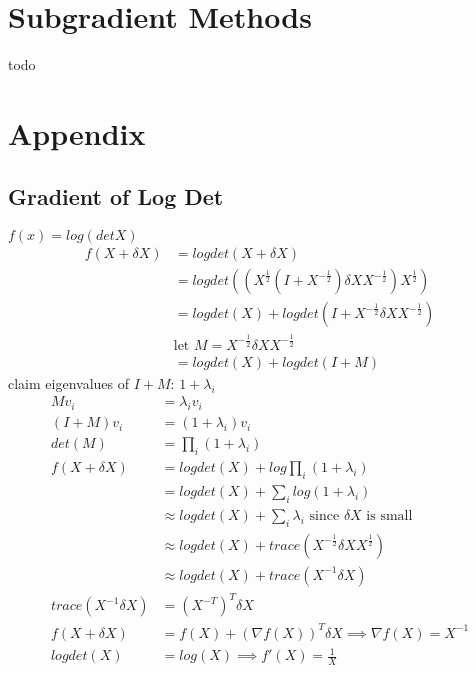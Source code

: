 \documentclass[8pt]{report}
\begin{document}
\begin{multicols*}{2}
  \pagebreak

  \section{Subgradient Methods}

  todo

  \pagebreak
  
  \section{Appendix}

  \subsection{Gradient of Log Det}
  $f(x)=log(det X)$\\
  \begin{align*}
    f(X+\delta X) &= logdet(X+\delta X)\\
                  &= logdet((X^{\frac{1}{2}}(I+X^{-\frac{1}{2}}) \delta X X^{-\frac{1}{2}})X^{\frac{1}{2}})\\
                  &= logdet(X)+logdet(I+X^{-\frac{1}{2}} \delta X X^{-\frac{1}{2}})\\
                  & \text{let } M = X^{-\frac{1}{2}} \delta X X^{-\frac{1}{2}}\\
                  &= logdet(X)+logdet(I+M)
  \end{align*}
  claim eigenvalues of $I+M$: $1+\lambda_i$
  \begin{align*}
    Mv_i &= \lambda_i v_i\\
    (I+M)v_i &= (1+\lambda_i)v_i\\
    det(M)&=\prod_i(1+\lambda_i)\\
    f(X+\delta X) &= logdet(X) + log \prod_i(1+\lambda_i)\\
         &= logdet(X) + \sum_i log(1+\lambda_i)\\
         &\approx logdet(X) + \sum_i \lambda_i \text{ since } \delta X \text{ is small}\\
         &\approx logdet(X) + trace(X^{-\frac{1}{2}} \delta X X^{\frac{1}{2}})\\
         &\approx logdet(X) + trace(X^{-1} \delta X)\\
    trace(X^{-1} \delta X) &= (X^{-T})^T \delta X\\
    f(X+\delta X) &= f(X) + (\nabla f(X))^T \delta X \implies \nabla f(X) = X^{-1}\\
    logdet(X) &= log(X) \implies f'(X)=\frac{1}{X}
  \end{align*}
    

\end{multicols*}
\end{document}
